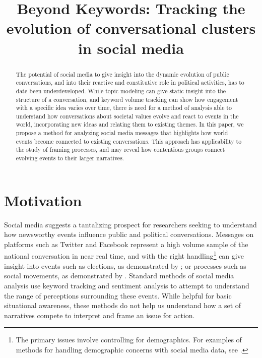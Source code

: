 \documentclass[12pt]{article}
\title{Beyond Keywords: Tracking the evolution of conversational clusters in social media}
\begin{document}
\maketitle

\begin{abstract}
   The potential of social media to give insight into the dynamic evolution of public conversations, and into their reactive and constitutive role in political activities, has to date been underdeveloped. While topic modeling can give static insight into the structure of a conversation, and keyword volume tracking can show how engagement with a specific idea varies over time, there is need for a method of analysis able to understand how conversations about societal values evolve and react to events in the world, incorporating new ideas and relating them to existing themes. In this paper, we propose a method for analyzing social media messages that highlights how world events become connected to existing conversations. This approach has applicability to the study of framing processes, and may reveal how contentious groups connect evolving events to their larger narratives.
\end{abstract}

\doublespacing

\section{Motivation}
	Social media suggests a tantalizing prospect for researchers seeking to understand how newsworthy events influence public and political conversations. Messages on platforms such as Twitter and Facebook represent a high volume sample  of the national conversation in near real time, and with the right handling\footnote{The primary issues involve controlling for demographics. For examples of methods for handling demographic concerns with social media data, see \cite{Bail2015b,McCormick2015}.} can give insight into events such as elections, as demonstrated by \cite{Huberty2013,Tumasjan2010}; or processes such as social movements, as demonstrated by \cite{Agarwal2014,DiGrazia2015}. 
Standard methods of social media analysis use keyword tracking and sentiment analysis to attempt to understand the range of perceptions surrounding these events. 
While helpful for basic situational awareness, these methods do not help us understand how a set of narratives compete to interpret and frame an issue for action.
\end{document}
